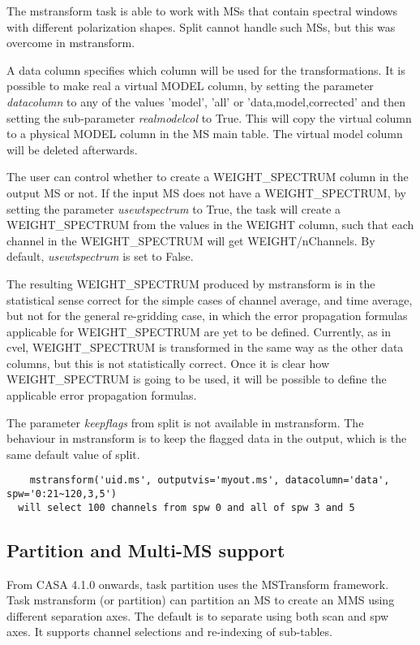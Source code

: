 The mstransform task is able to work with MSs that contain spectral windows with 
different polarization shapes. Split cannot handle such MSs, but this was overcome 
in mstransform.

A data column specifies which column will be used for the transformations. It is
possible to make real a virtual MODEL column, by setting the parameter
{\it datacolumn} to any of the values 'model', 'all' or 'data,model,corrected'
and then setting the sub-parameter {\it realmodelcol} to True. This will copy the virtual
column to a physical MODEL column in the MS main table. The virtual model column
will be deleted afterwards.

The user can control whether to create a WEIGHT_SPECTRUM column in the output MS or
not. If the input MS does not have a WEIGHT_SPECTRUM, by setting the parameter
{\it usewtspectrum} to True, the task will create a WEIGHT_SPECTRUM from the values
in the WEIGHT column, such that each channel in the WEIGHT_SPECTRUM will get WEIGHT/nChannels.
By default, {\it usewtspectrum} is set to False.

The resulting WEIGHT_SPECTRUM produced by mstransform is in the statistical sense 
correct for the simple cases of channel average, and time average, but not for the 
general re-gridding case, in which the error propagation formulas applicable for 
WEIGHT_SPECTRUM are yet to be defined. Currently, as in cvel, WEIGHT_SPECTRUM is 
transformed in the same way as the other data columns, but this is not statistically 
correct. Once it is clear how WEIGHT_SPECTRUM is going to be used, it will be possible 
to define the applicable error propagation formulas.

The parameter {\it keepflags} from split is not available in mstransform. The
behaviour in mstransform is to keep the flagged data in the output,
which is the same default value of split.

\begin{verbatim}
    mstransform('uid.ms', outputvis='myout.ms', datacolumn='data', spw='0:21~120,3,5')
  will select 100 channels from spw 0 and all of spw 3 and 5
\end{verbatim}

\subsection{Partition and Multi-MS support}
From CASA 4.1.0 onwards, task partition uses the MSTransform framework.
Task mstransform (or partition) can partition an MS to create an MMS using
different separation axes. The default is to separate using both scan and spw axes.
It supports channel selections and re-indexing of sub-tables. 

